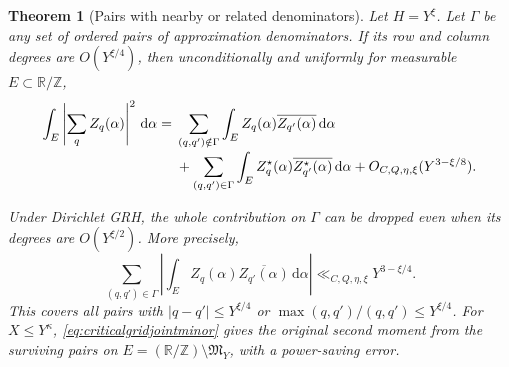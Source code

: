 \documentclass[11pt,a4paper]{article}
\numberwithin{equation}{section}
\newtheorem{theorem}{Theorem}[section]
\newcommand{\ud}{\mathrm d}
\begin{document}
\begin{theorem}[Pairs with nearby or related denominators]
\label{thm:criticalgriddenominatorpairs}
Let $H=Y^\xi$. Let $\Gamma$ be any set of ordered pairs
of approximation denominators. If its row and column degrees
are $O(Y^{\xi/4})$, then unconditionally and
uniformly for measurable $E\subset\mathbb R/\mathbb Z$,
\begin{align}
 \int_E\left|\sum_q Z_q(\alpha)\right|^2\,\ud\alpha
  ={}&\sum_{(q,q')\notin\Gamma}
             \int_E Z_q(\alpha)\overline{Z_{q'}(\alpha)}\,\ud\alpha
   \notag\\[-2pt]
  &+\sum_{(q,q')\in\Gamma}
            \int_E Z_q^{\star}(\alpha)
                          \overline{Z_{q'}^{\star}(\alpha)}\,\ud\alpha
    +O_{C,Q,\eta,\xi}(Y^{3-\xi/8}).
 \label{eq:criticalgriddenominatorpairs}
\end{align}

Under Dirichlet GRH, the whole contribution on $\Gamma$
can be dropped even when its degrees are $O(Y^{\xi/2})$.
More precisely,
\begin{equation}
 \sum_{(q,q')\in\Gamma}
   \left|\int_E Z_q(\alpha)\overline{Z_{q'}(\alpha)}\,\ud\alpha\right|
       \ll_{C,Q,\eta,\xi} Y^{3-\xi/4}.
 \label{eq:criticalgridoffdenominator}
\end{equation}
This covers all pairs with $|q-q'|\le Y^{\xi/4}$ or
$\max(q,q')/(q,q')\le Y^{\xi/4}$. For $X\le Y^\kappa$,
\cref{eq:criticalgridjointminor} gives the original second
moment from the surviving pairs on
$E=(\mathbb R/\mathbb Z)\setminus\mathfrak M_Y$, with a
power-saving error.
\end{theorem}
\end{document}
